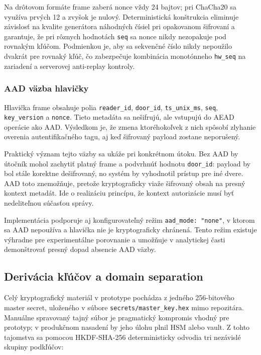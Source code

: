 \documentclass[journal,a4paper,onecolumn]{IEEEtran}
\begin{document}
Na drôtovom formáte frame zaberá nonce vždy 24 bajtov; pri ChaCha20 sa využíva prvých 12 a zvyšok je nulový. Deterministická konštrukcia eliminuje závislosť na kvalite generátora náhodných čísiel pri opakovanom šifrovaní a garantuje, že pri rôznych hodnotách \texttt{seq} sa nonce nikdy nezopakuje pod rovnakým kľúčom. Podmienkou je, aby sa sekvenčné číslo nikdy nepoužilo dvakrát pre rovnaký kľúč, čo zabezpečuje kombinácia monotónneho \texttt{hw\_seq} na zariadení a serverovej anti-replay kontroly.

\subsubsection{AAD väzba hlavičky}

Hlavička frame obsahuje polia \texttt{reader\_id}, \texttt{door\_id}, \texttt{ts\_unix\_ms}, \texttt{seq}, \texttt{key\_version} a \texttt{nonce}. Tieto metadáta sa nešifrujú, ale vstupujú do AEAD operácie ako AAD. Výsledkom je, že zmena ktoréhokoľvek z nich spôsobí zlyhanie overenia autentifikačného tagu, aj keď šifrovaný payload zostane neporušený\cite{RFC5116}.

Praktický význam tejto väzby sa ukáže pri konkrétnom útoku. Bez AAD by útočník mohol zachytiť platný frame a podvrhnúť hodnotu \texttt{door\_id}: payload by bol stále korektne dešifrovaný, no systém by vyhodnotil prístup pre iné dvere. AAD toto znemožňuje, pretože kryptograficky viaže šifrovaný obsah na presný kontext metadát. Ide o realizáciu princípu, že kontext autorizácie musí byť nedeliteľnou súčasťou správy.

Implementácia podporuje aj konfigurovateľný režim \texttt{aad\_mode: "none"}, v ktorom sa AAD nepoužíva a hlavička nie je kryptograficky chránená. Tento režim existuje výhradne pre experimentálne porovnanie a umožňuje v analytickej časti demonštrovať presný dopad absencie AAD väzby.

\subsection{Derivácia kľúčov a domain separation}

Celý kryptografický materiál v prototype pochádza z jedného 256-bitového master secret, uloženého v súbore \texttt{secrets/master\_key.hex} mimo repozitára. Manuálne spravovaný tajný súbor je pragmatický kompromis vhodný pre prototyp; v produkčnom nasadení by jeho úlohu plnil HSM alebo vault\cite{NIST80057}. Z tohto tajomstva sa pomocou HKDF-SHA-256\cite{RFC5869} deterministicky odvodia tri nezávislé skupiny podkľúčov:
\end{document}
